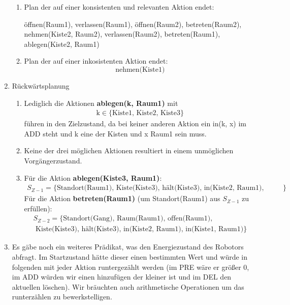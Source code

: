 \documentclass[a4paper,10pt]{article}
\begin{document}
\begin{enumerate}[~~a.)]
\begin{enumerate}[~~i)]
        \item Plan der auf einer konsistenten und relevanten Aktion endet:
        \begin{center}
         öffnen(Raum1), verlassen(Raum1), öffnen(Raum2), betreten(Raum2), \\
         nehmen(Kiste2, Raum2), verlassen(Raum2), betreten(Raum1), ablegen(Kiste2, Raum1)
        \end{center}
        \item Plan der auf einer inkosistenten Aktion endet:
        $$\textrm{nehmen(Kiste1)}$$
    \end{enumerate}
    \item Rückwärtsplanung
    \begin{enumerate}[~~i)]
    	\item Lediglich die Aktionen \textbf{ablegen(k, Raum1)} mit
    	\begin{align*}
    	\textrm{k} \in \{\textrm{Kiste1, Kiste2, Kiste3}\}
    	\end{align*}
    	führen in den Zielzustand, da bei keiner anderen Aktion ein in(k, 			x) im ADD steht und k eine der Kisten und x Raum1 sein muss. 
    	\item Keine der drei möglichen Aktionen resultiert in einem 				unmöglichen Vorgängerzustand.
    	\item Für die Aktion \textbf{ablegen(Kiste3, Raum1)}:
    	\begin{align*}
    	S_{Z-1} = \{\textrm{Standort(Raum1), Kiste(Kiste3), hält(Kiste3), 			in(Kiste2, Raum1), in(Kiste1, Raum1)}\}
    	\end{align*}
    	Für die Aktion \textbf{betreten(Raum1)} (um Standort(Raum1) aus 			$S_{Z-1}$ zu erfüllen):
    	\begin{align*}
    	S_{Z-2} = \{\textrm{Standort(Gang), Raum(Raum1), offen(Raum1),}\\ 			\textrm{ Kiste(Kiste3), hält(Kiste3), in(Kiste2, Raum1), 					in(Kiste1, Raum1)}\}
    	\end{align*}
    	\end{enumerate}
    \item Es gäbe noch ein weiteres Prädikat, was den Energiezustand des Robotors abfragt. Im Startzustand hätte dieser einen bestimmten Wert und würde in folgenden mit jeder Aktion runtergezählt werden (im PRE wäre er größer 0, im ADD würden wir einen hinzufügen der kleiner ist und im DEL den aktuellen löschen). Wir bräuchten auch arithmetische Operationen um das runterzählen zu bewerkstelligen.

\end{enumerate}
\end{document}
